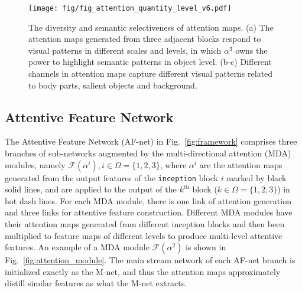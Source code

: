 \documentclass[10pt,twocolumn,letterpaper]{article}
\begin{document}
\begin{figure}[t]
\centering
\texttt{[image: fig/fig\_attention\_quantity\_level\_v6.pdf]}
\caption{The diversity and semantic selectiveness of attention maps. (a) The attention maps generated from three adjacent blocks respond to visual patterns in different scales and levels, in which $\alpha^3$ owns the power to highlight semantic patterns in object level. (b-c) Different channels in attention maps capture different visual patterns related to body parts, salient objects and background.
}
\label{fig:attention_level}
\end{figure}


\vspace{-0.1cm}
\subsection{Attentive Feature Network}
\label{subsec:model_single_branch}

The Attentive Feature Network (AF-net) in Fig.~\ref{fig:framework} comprises three branches of sub-networks augmented by the multi-directional attention (MDA) modules, namely $\mathcal{F}(\alpha^i), i\in\Omega=\{1,2,3\}$, where $\alpha^i$ are the attention maps generated from the output features of the \texttt{inception} block $i$ marked by black solid lines, and are applied to the output of the $k^\text{th}$ block ($k\in\Omega=\{1,2,3\}$) in hot dash lines.
%
For each MDA module, there is one link of attention generation and three links for attentive feature construction. Different MDA modules have their attention maps generated from different inception blocks and then been multiplied to feature maps of different levels to produce multi-level attentive features. An example of a MDA module $\mathcal{F}(\alpha^2)$ is shown in Fig.~\ref{fig:attention_module}.
%
%
The main stream network of each AF-net branch is initialized exactly as the M-net, and thus the attention maps approximately distill similar features as what the M-net extracts.
\end{document}
